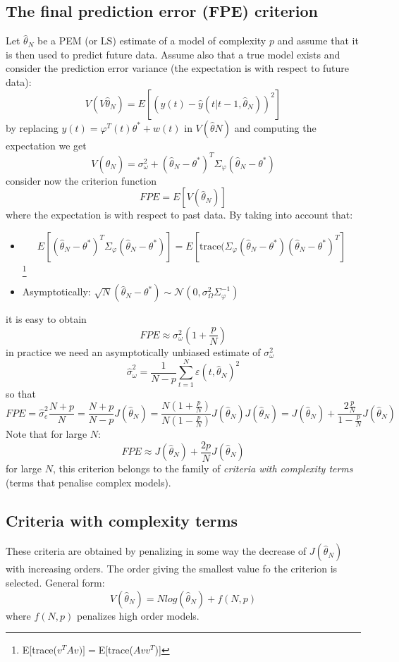 \documentclass{book}
\begin{document}
\subsection{The final prediction error (FPE) criterion}
Let $\hat{\theta}_N$ be a PEM (or LS) estimate of a model of complexity $p$ and assume that it is then used to predict future data. Assume also that a true model exists and consider the prediction error variance (the expectation is with respect to future data):
\[
    V(V\hat{\theta}_N) = E \left[ (y(t)-\hat{y}(t|t-1,\hat{\theta}_N))^2   \right]
\]
by replacing $y(t)=\varphi^T(t)\theta^*+w(t)$ in $V(\hat{\theta}N)$ and computing the expectation we get
\[
    V(\hat{\theta}_N) = \sigma_\omega^2 + (\hat{\theta}_N-\theta^*)^T\Sigma_\varphi(\hat{\theta}_N-\theta^*)
\]
consider now the criterion function
\[
    FPE = E[V(\hat{\theta}_N)]
\]
where the expectation is with respect to past data. By taking into account that:
\begin{itemize}
    \item \[
            E[(\hat{\theta}_N-\theta^*)^T\Sigma_{\varphi}(\hat{\theta}_N-\theta^*)]=E[\text{trace}(\Sigma_\varphi(\hat{\theta}_N-\theta^*)(\hat{\theta}_N-\theta^*)^T]
        \]\footnote{E[trace($v^TAv)]=$E[trace($Avv^T$)]}
\item Asymptotically: $\sqrt{N}(\hat{\theta}_N-\theta^*)\sim\mathcal{N}(0,\sigma^2_\Omega\Sigma_\varphi^{-1})$
\end{itemize}
it is easy to obtain
\[
    FPE\approx \sigma_\omega^2\left( 1+\displaystyle\frac{p}{N}\right)
\]
in practice we need an asymptotically unbiased estimate of $\sigma_\omega^2$ 
\[
    \hat{\sigma}_\omega^2 = \displaystyle\frac{1}{N-p}\displaystyle\sum_{t=1}^{N}\varepsilon(t,\hat{\theta}_N)^2 
\]
so that
\[
    FPE=\hat{\sigma}_e^2 \displaystyle\frac{N+p}{N}=\displaystyle\frac{N+p}{N-p}J(\hat{\theta}_N)=\displaystyle\frac{N\left(1+\displaystyle\frac{p}{N}\right)}{N\left(1-\displaystyle\frac{p}{N}\right)}J(\hat{\theta}_N)J(\hat{\theta}_N)=J(\hat{\theta}_N)+\displaystyle\frac{2\displaystyle\frac{p}{N}}{1-\displaystyle\frac{p}{N}}J(\hat{\theta}_N)
\]
Note that for large $N$:
\[
    FPE\approx J(\hat{\theta}_N)+\displaystyle\frac{2p}{N}J(\hat{\theta}_N)
\]
for large $N$, this criterion belongs to the family of \emph{criteria with complexity terms} (terms that penalise complex models).

\subsection{Criteria with complexity terms}
These criteria are obtained by penalizing in some way the decrease of $J(\hat{\theta}_N)$with increasing orders. The order giving the smallest value fo the criterion is selected.
General form:
\[
    V(\hat{\theta}_N)=Nlog(\hat{\theta}_N)+f(N,p)
\]
where $f(N,p)$ penalizes high order models.
\end{document}
